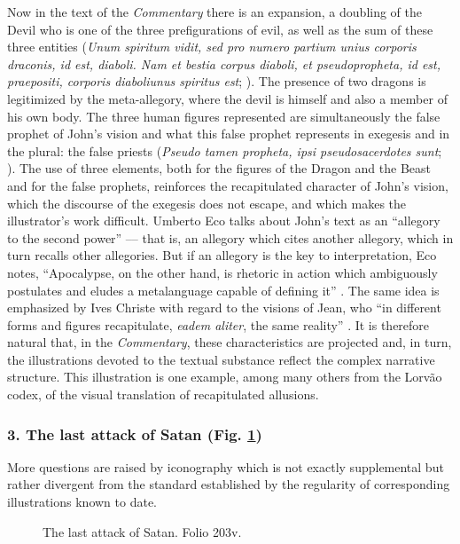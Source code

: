 \begin{paper}
Now in the text of the
\emph{Commentary} there is an expansion, a doubling of the Devil who is
one of the three prefigurations of evil, as well as the sum of these
three entities (\emph{Unum spiritum vidit, sed pro numero partium unius
corporis draconis, id est, diaboli. Nam et bestia corpus diaboli, et
pseudopropheta, id est, praepositi, corporis diaboliunus spiritus est}; \mancite\citealt[552]{gonzalez_echegaray_obras_1995}). The presence of two dragons is
legitimized by the meta-allegory, where the devil is himself and also a
member of his own body. The three human figures represented are
simultaneously the false prophet of John's vision and what this false
prophet represents in exegesis and in the plural: the false priests
(\emph{Pseudo tamen propheta, ipsi pseudosacerdotes sunt};
\citealt[552]{gonzalez_echegaray_obras_1995}). The use of three elements, both for the figures of the
Dragon and the Beast and for the false prophets, reinforces the
recapitulated character of John's vision, which the discourse of the
exegesis does not escape, and which makes the illustrator's work
difficult. Umberto Eco talks about John's text as an ``allegory to the
second power'' –– that is, an allegory which cites another allegory,
which in turn recalls other allegories. But if an allegory is the key to
interpretation, Eco notes, ``Apocalypse, on the other hand, is rhetoric
in action which ambiguously postulates and eludes a metalanguage capable
of defining it'' \citep[26--27]{eco_beato_1982}. The same idea is emphasized by Ives
Christe with regard to the visions of Jean, who ``in different forms and
figures recapitulate, \emph{eadem aliter}, the same reality'' \citep[1:56]{noauthor_actas_1978}. It is therefore natural that, in the \emph{Commentary},
these characteristics are projected and, in turn, the illustrations
devoted to the textual substance reflect the complex narrative
structure. This illustration is one example, among many others from the
Lorvão codex, of the visual translation of recapitulated allusions.

\subsubsection{3. The last attack of Satan (Fig. \ref{fig:rocha:attack})} More questions are
raised by iconography which is not exactly supplemental but rather
divergent from the standard established by the regularity of
corresponding illustrations known to date. 

\begin{figure}[H]
    \centering
    \caption{The last attack of Satan. Folio 203v.}
    \label{fig:rocha:attack}
\end{figure}


\end{paper}
